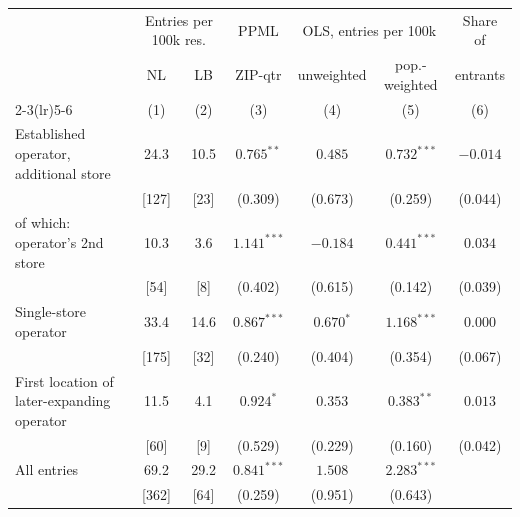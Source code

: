 \begin{tabular}{@{}lcccccc@{}}
\toprule
 & \multicolumn{2}{c}{Entries per 100k res.} & PPML & \multicolumn{2}{c}{OLS, entries per 100k} & Share of \\
 & NL & LB & ZIP-qtr & unweighted & pop.-weighted & entrants \\
\cmidrule(lr){2-3}\cmidrule(lr){5-6}
 & (1) & (2) & (3) & (4) & (5) & (6) \\
\midrule
Established operator, additional store & 24.3 & 10.5 & $0.765^{**}$ & $0.485$ & $0.732^{***}$ & $-0.014$ \\
 & [127] & [23] & (0.309) & (0.673) & (0.259) & (0.044) \\
  of which: operator's 2nd store & 10.3 & 3.6 & $1.141^{***}$ & $-0.184$ & $0.441^{***}$ & $0.034$ \\
 & [54] & [8] & (0.402) & (0.615) & (0.142) & (0.039) \\
Single-store operator & 33.4 & 14.6 & $0.867^{***}$ & $0.670^{*}$ & $1.168^{***}$ & $0.000$ \\
 & [175] & [32] & (0.240) & (0.404) & (0.354) & (0.067) \\
First location of later-expanding operator & 11.5 & 4.1 & $0.924^{*}$ & $0.353$ & $0.383^{**}$ & $0.013$ \\
 & [60] & [9] & (0.529) & (0.229) & (0.160) & (0.042) \\
All entries & 69.2 & 29.2 & $0.841^{***}$ & $1.508$ & $2.283^{***}$ &  \\
 & [362] & [64] & (0.259) & (0.951) & (0.643) &  \\
\bottomrule
\end{tabular}
